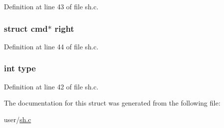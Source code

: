 Definition at line 43 of file sh.\-c.

\hypertarget{structlistcmd_ab5429c86b9ebd1279ea5674110a2190b}{
\subsubsection[{right}]{\setlength{\rightskip}{0pt plus 5cm}struct {\bf cmd}$\ast$ right}}\label{structlistcmd_ab5429c86b9ebd1279ea5674110a2190b}


Definition at line 44 of file sh.\-c.

\hypertarget{structlistcmd_ac765329451135abec74c45e1897abf26}{
\subsubsection[{type}]{\setlength{\rightskip}{0pt plus 5cm}int type}}\label{structlistcmd_ac765329451135abec74c45e1897abf26}


Definition at line 42 of file sh.\-c.



The documentation for this struct was generated from the following file\-:\begin{DoxyCompactItemize}
\item 
user/\hyperlink{sh_8c}{sh.\-c}\end{DoxyCompactItemize}

